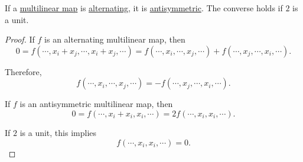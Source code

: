 \begin{proposition}\label{thm:alternating_multilinear_is_antisymmetric}
  If a \hyperref[def:multilinear_function]{multilinear map} is \hyperref[def:alternating_function]{alternating}, it is \hyperref[def:antisymmetric_function]{antisymmetric}. The converse holds if \( 2 \) is a unit.
\end{proposition}
\begin{proof}
  \SufficiencySubProof If \( f \) is an alternating multilinear map, then
  \begin{equation*}
    0
    =
    f(\cdots, x_i + x_j, \cdots, x_i + x_j, \cdots)
    =
    f(\cdots, x_i, \cdots, x_j, \cdots)
    +
    f(\cdots, x_j, \cdots, x_i, \cdots).
  \end{equation*}

  Therefore,
  \begin{equation*}
    f(\cdots, x_i, \cdots, x_j, \cdots)
    =
    -f(\cdots, x_j, \cdots, x_i, \cdots).
  \end{equation*}

  \NecessitySubProof If \( f \) is an antisymmetric multilinear map, then
  \begin{equation*}
    0
    =
    f(\cdots, x_i + x_i, x_i, \cdots)
    =
    2 f(\cdots, x_i, x_i, \cdots).
  \end{equation*}

  If \( 2 \) is a unit, this implies
  \begin{equation*}
    f(\cdots, x_i, x_i, \cdots) = 0.
  \end{equation*}
\end{proof}

